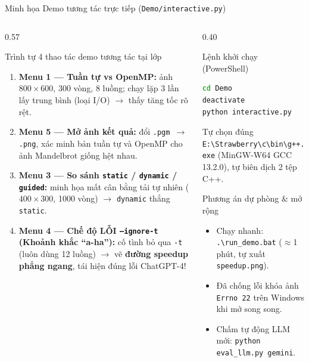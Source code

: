 \documentclass[aspectratio=169,10pt]{beamer}
\newcommand{\code}[1]{\texttt{\color{BlueDark}#1}}
\begin{document}
\begin{frame}[fragile]{Minh họa Demo tương tác trực tiếp (\texttt{Demo/interactive.py})}
\begin{columns}[T,totalwidth=\textwidth]
  \begin{column}{0.57\textwidth}
    \begin{bluebox}[height=5.65cm,top=4pt,bottom=4pt]{Trình tự 4 thao tác demo tương tác tại lớp}
      \begin{enumerate}\scriptsize\setlength{\itemsep}{5pt}
        \item \textbf{Menu 1 --- Tuần tự vs OpenMP:} ảnh $800\times 600$, 300 vòng, 8 luồng; chạy lặp 3 lần lấy trung bình (loại I/O) $\to$ thấy tăng tốc rõ rệt.
        \item \textbf{Menu 5 --- Mở ảnh kết quả:} đổi \code{.pgm $\to$ .png}, xác minh bản tuần tự và OpenMP cho ảnh Mandelbrot giống hệt nhau.
        \item \textbf{Menu 3 --- So sánh \code{static} / \code{dynamic} / \code{guided}:} minh họa mất cân bằng tải tự nhiên ($400\times 300$, 1000 vòng) $\to$ \code{dynamic} thắng \code{static}.
        \item \textbf{Menu 4 --- Chế độ LỖI \code{--ignore-t} (Khoảnh khắc ``a-ha''):} cố tình bỏ qua \code{-t} (luôn dùng 12 luồng) $\to$ vẽ \textbf{đường speedup phẳng ngang}, tái hiện đúng lỗi ChatGPT-4!
      \end{enumerate}
    \end{bluebox}
  \end{column}
  \begin{column}{0.40\textwidth}
    \begin{bluebox}[height=2.68cm,top=3pt,bottom=3pt]{Lệnh khởi chạy (PowerShell)}
\begin{lstlisting}[language=bash,basicstyle=\ttfamily\scriptsize]
cd Demo
deactivate
python interactive.py
\end{lstlisting}
      \tiny\color{Muted}Tự chọn đúng \code{E:\textbackslash Strawberry\textbackslash c\textbackslash bin\textbackslash g++.exe} (MinGW-W64 GCC 13.2.0), tự biên dịch 2 tệp C++.
    \end{bluebox}
    \vspace{0.29cm}
    \begin{hboxcard}[height=2.68cm,top=3pt,bottom=3pt]{Phương án dự phòng \& mở rộng}
      \begin{itemize}\scriptsize\setlength{\itemsep}{2.5pt}
        \item Chạy nhanh: \code{.\textbackslash run\_demo.bat} ($\approx$1 phút, tự xuất \code{speedup.png}).
        \item Đã chống lỗi khóa ảnh \code{Errno 22} trên Windows khi mở song song.
        \item Chấm tự động LLM mới: \code{python eval\_llm.py gemini}.
      \end{itemize}
    \end{hboxcard}
  \end{column}
\end{columns}
\end{frame}
\end{document}
